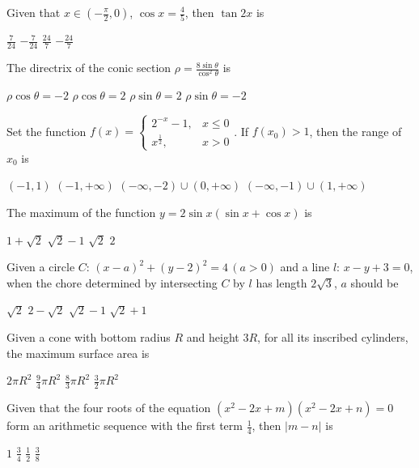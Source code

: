 \documentclass[letterpaper,10pt,addpoints]{exam}
\begin{document}
\begin{questions}
\question
Given that $x\in (-\frac{\pi}{2},0)$, $\cos x=\frac{4}{5}$, then $\tan 2x$ is
\begin{choices}
\choice $\frac{7}{24}$
\choice $-\frac{7}{24}$
\choice $\frac{24}{7}$
\choice $-\frac{24}{7}$
\end{choices}

\question
The directrix of the conic section $\rho=\frac{8\sin\theta}{\cos^2\theta}$ is
\begin{choices}
\choice $\rho\cos\theta=-2$
\choice $\rho\cos\theta=2$
\choice $\rho\sin\theta=2$
\choice $\rho\sin\theta=-2$
\end{choices}

\question
Set the function $f(x)=\begin{cases}
2^{-x}-1, & x\leq 0 \\ 
x^{\frac{1}{2}}, & x>0 
\end{cases}$. If $f(x_0)>1$, then the range of $x_0$ is
\begin{choices}
\choice $(-1,1)$
\choice $(-1,+\infty)$
\choice $(-\infty,-2)\cup (0,+\infty)$
\choice $(-\infty,-1)\cup(1,+\infty)$
\end{choices}

\question
The maximum of the function $y=2\sin x(\sin x+\cos x)$ is
\begin{choices}
\choice $1+\sqrt{2}$
\choice $\sqrt{2}-1$
\choice $\sqrt{2}$
\choice $2$
\end{choices}

\question
Given a circle $C$: $(x-a)^{2}+(y-2)^{2}=4\,(a>0)$ and a line $l$: $x-y+3=0$, when the chore determined by intersecting $C$ by $l$ has length $2\sqrt{3}$, $a$ should be
\begin{choices}
\choice $\sqrt{2}$
\choice $2-\sqrt{2}$
\choice $\sqrt{2}-1$
\choice $\sqrt{2}+1$
\end{choices}

\question
Given a cone with bottom radius $R$ and height $3R$, for all its inscribed cylinders, the maximum surface area is
\begin{choices}
\choice $2\pi R^{2}$
\choice $\frac{9}{4} \pi R^{2}$
\choice $\frac{8}{3} \pi R^{2}$
\choice $\frac{3}{2} \pi R^{2}$
\end{choices}

\question
Given that the four roots of the equation $\left(x^{2}-2 x+m\right)\left(x^{2}-2 x+n\right)=0$ form an arithmetic sequence with the first term $\frac{1}{4}$, then $|m-n|$ is
\begin{choices}
\choice $1$
\choice $\frac{3}{4}$
\choice $\frac{1}{2}$
\choice $\frac{3}{8}$
\end{choices}


\end{questions}
\end{document}
